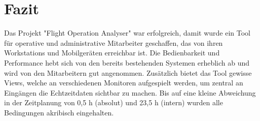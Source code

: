 \section{Fazit}
    Das Projekt "Flight Operation Analyser" war erfolgreich, damit wurde ein Tool für operative und administrative Mitarbeiter geschaffen, das von ihren Workstations und Mobilgeräten erreichbar ist. Die Bedienbarkeit und Performance hebt sich von den bereits bestehenden Systemen erheblich ab und wird von den Mitarbeitern gut angenommen. Zusätzlich bietet das Tool gewisse Views, welche an verschiedenen Monitoren aufgespielt werden, um zentral an Eingängen die Echtzeitdaten sichtbar zu machen. Bis auf eine kleine Abweichung in der Zeitplanung von 0,5 h (absolut) und 23,5 h (intern) wurden alle Bedingungen akribisch eingehalten. 
